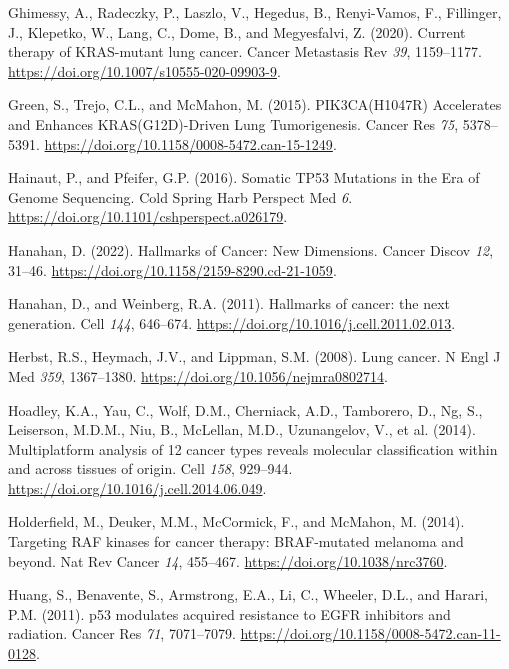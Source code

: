 \begin{CSLReferences}{0}{0}
\leavevmode{}%
Ghimessy, A., Radeczky, P., Laszlo, V., Hegedus, B., Renyi-Vamos, F., Fillinger, J., Klepetko, W., Lang, C., Dome, B., and Megyesfalvi, Z. (2020). Current therapy of KRAS-mutant lung cancer. Cancer Metastasis Rev \emph{39}, 1159--1177. \url{https://doi.org/10.1007/s10555-020-09903-9}.

\leavevmode{}%
Green, S., Trejo, C.L., and McMahon, M. (2015). PIK3CA(H1047R) Accelerates and Enhances KRAS(G12D)-Driven Lung Tumorigenesis. Cancer Res \emph{75}, 5378--5391. \url{https://doi.org/10.1158/0008-5472.can-15-1249}.

\leavevmode{}%
Hainaut, P., and Pfeifer, G.P. (2016). Somatic TP53 Mutations in the Era of Genome Sequencing. Cold Spring Harb Perspect Med \emph{6}. \url{https://doi.org/10.1101/cshperspect.a026179}.

\leavevmode{}%
Hanahan, D. (2022). Hallmarks of Cancer: New Dimensions. Cancer Discov \emph{12}, 31--46. \url{https://doi.org/10.1158/2159-8290.cd-21-1059}.

\leavevmode{}%
Hanahan, D., and Weinberg, R.A. (2011). Hallmarks of cancer: the next generation. Cell \emph{144}, 646--674. \url{https://doi.org/10.1016/j.cell.2011.02.013}.

\leavevmode{}%
Herbst, R.S., Heymach, J.V., and Lippman, S.M. (2008). Lung cancer. N Engl J Med \emph{359}, 1367--1380. \url{https://doi.org/10.1056/nejmra0802714}.

\leavevmode{}%
Hoadley, K.A., Yau, C., Wolf, D.M., Cherniack, A.D., Tamborero, D., Ng, S., Leiserson, M.D.M., Niu, B., McLellan, M.D., Uzunangelov, V., et al. (2014). Multiplatform analysis of 12 cancer types reveals molecular classification within and across tissues of origin. Cell \emph{158}, 929--944. \url{https://doi.org/10.1016/j.cell.2014.06.049}.

\leavevmode{}%
Holderfield, M., Deuker, M.M., McCormick, F., and McMahon, M. (2014). Targeting RAF kinases for cancer therapy: BRAF-mutated melanoma and beyond. Nat Rev Cancer \emph{14}, 455--467. \url{https://doi.org/10.1038/nrc3760}.

\leavevmode{}%
Huang, S., Benavente, S., Armstrong, E.A., Li, C., Wheeler, D.L., and Harari, P.M. (2011). p53 modulates acquired resistance to EGFR inhibitors and radiation. Cancer Res \emph{71}, 7071--7079. \url{https://doi.org/10.1158/0008-5472.can-11-0128}.


\end{CSLReferences}
